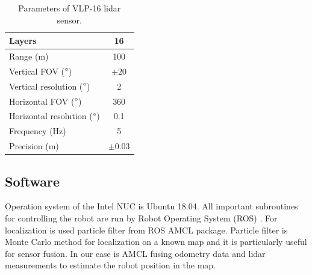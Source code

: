 \begin{table}[H]
\centering
\begin{tabular}{|l|c|}
\hline
Layers                            & 16   \\ \hline
Range (m)                         & 100  \\ \hline
Vertical FOV ($\degree$)          & $\pm20$   \\ \hline
Vertical resolution ($\degree$)   & 2    \\ \hline
Horizontal FOV ($\degree$)        & 360  \\ \hline
Horizontal resolution ($\degree$) & 0.1  \\ \hline
Frequency (Hz)                    & 5    \\ \hline
Precision (m)                     & $\pm0.03$ \\ \hline
\end{tabular}
\caption{Parameters of VLP-16 lidar sensor.}
\label{tab:lidar}
\end{table}

\subsection{Software}
Operation system of the Intel NUC is Ubuntu 18.04. All important subroutines for controlling the robot are run by Robot Operating System (ROS) \cite{ros}. For localization is used particle filter from ROS AMCL package. Particle filter is Monte Carlo method for localization on a known map and it is particularly useful for sensor fusion. In our case is AMCL fusing odometry data and lidar measurements to estimate the robot position in the map.
